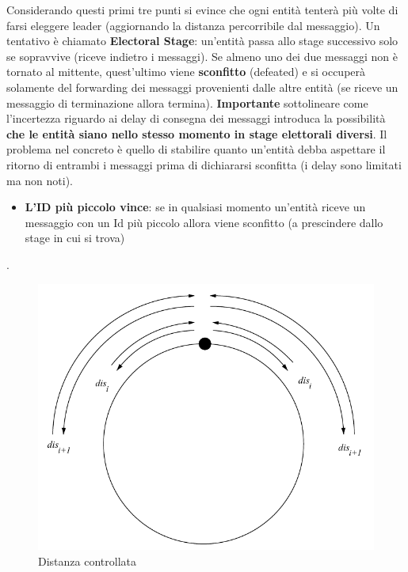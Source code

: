\documentclass[12pt]{article}
\begin{document}
			Considerando questi primi tre punti si evince che ogni entità tenterà più volte di farsi eleggere leader (aggiornando la distanza percorribile dal messaggio). Un tentativo è chiamato \textbf{Electoral Stage}: un'entità passa allo stage successivo solo se sopravvive (riceve indietro i messaggi). Se almeno uno dei due messaggi non è tornato al mittente, quest'ultimo viene \textbf{sconfitto} (defeated) e si occuperà solamente del forwarding dei messaggi provenienti dalle altre entità (se riceve un messaggio di terminazione allora termina). \textbf{Importante} sottolineare come l'incertezza riguardo ai delay di consegna dei messaggi introduca la possibilità \textbf{che le entità siano nello stesso momento in stage elettorali diversi}. Il problema nel concreto è quello di stabilire quanto un'entità debba aspettare il ritorno di entrambi i messaggi prima di dichiararsi sconfitta (i delay sono limitati ma non noti). 
			\begin{itemize}
				\item \textbf{L'ID più piccolo vince}: se in qualsiasi momento un'entità riceve un messaggio con un Id più piccolo allora viene sconfitto (a prescindere dallo stage in cui si trova)
			\end{itemize}.
			\begin{figure}[h!]
				\centering
				\includegraphics[scale=0.30]{img/condist.png}
				\caption{Distanza controllata}
			\end{figure}
\end{document}
